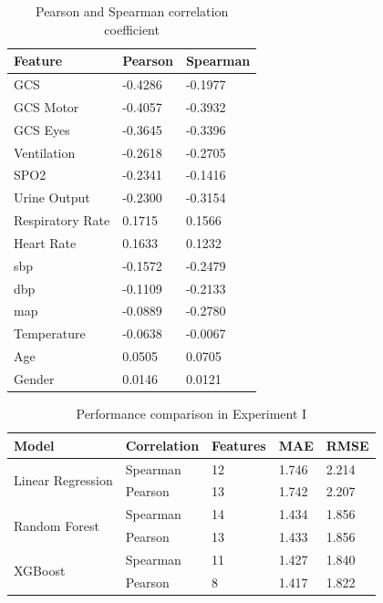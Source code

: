 \documentclass[12pt,a4paper,english
]{tunithesis}
\begin{document}
\begin{table}[]
\centering
    \caption{Pearson and Spearman correlation coefficient}
    \label{table:cc_value}
    \begin{tabular}{|l|l|l|}
        \hline
        \textbf{Feature} & \textbf{Pearson} & \textbf{Spearman} \\ \hline
            GCS & -0.4286 & -0.1977 \\ \hline
            GCS Motor & -0.4057 & -0.3932 \\ \hline
            GCS Eyes & -0.3645 & -0.3396 \\ \hline
            Ventilation & -0.2618 & -0.2705 \\ \hline
            SPO2 & -0.2341 & -0.1416 \\ \hline
            Urine Output & -0.2300 & -0.3154 \\ \hline
            Respiratory Rate & 0.1715 & 0.1566\\ \hline
            Heart Rate & 0.1633 & 0.1232 \\ \hline
            sbp & -0.1572 & -0.2479 \\ \hline
            dbp & -0.1109 & -0.2133 \\ \hline
            map & -0.0889 & -0.2780 \\ \hline
            Temperature & -0.0638 & -0.0067 \\ \hline
            Age & 0.0505 & 0.0705 \\ \hline
            Gender & 0.0146 & 0.0121 \\ \hline
    \end{tabular}
\end{table}


\begin{table}[]
\centering
    \caption{Performance comparison in Experiment I}
    \label{table:Perfomance_comparison}
    \begin{tabular}{|l|l|l|l|l|}
        \hline
        \textbf{Model} & \textbf{Correlation} & \textbf{Features} & \textbf{MAE} & \textbf{RMSE} \\ \hline
        \multirow{2}{*}{Linear Regression} & Spearman & 12 & 1.746 & 2.214 \\ \cline{2-5} 
         & Pearson & 13 & 1.742 & 2.207 \\ \hline
        \multirow{2}{*}{Random Forest} & Spearman & 14 & 1.434 & 1.856 \\ \cline{2-5} 
         & Pearson & 13 & 1.433 & 1.856 \\ \hline
        \multirow{2}{*}{XGBoost} & Spearman & 11& 1.427& 1.840\\ \cline{2-5} 
         & Pearson & 8 & 1.417 & 1.822 \\ \hline
    \end{tabular}
\end{table}
\end{document}
